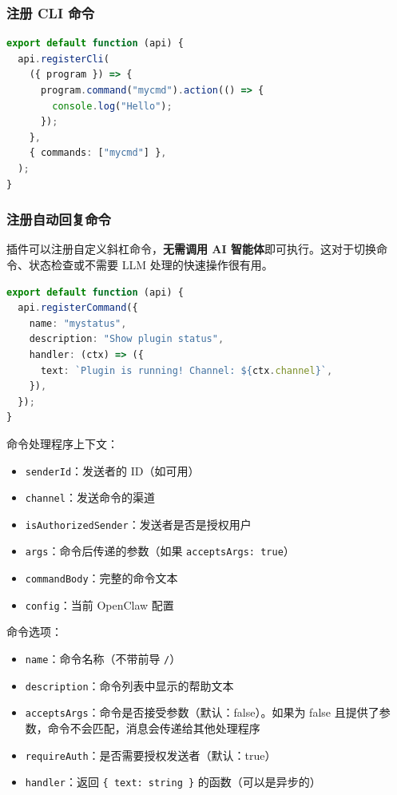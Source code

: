 \subsubsection{注册 CLI 命令}


\begin{lstlisting}[language=typescript]
export default function (api) {
  api.registerCli(
    ({ program }) => {
      program.command("mycmd").action(() => {
        console.log("Hello");
      });
    },
    { commands: ["mycmd"] },
  );
}
\end{lstlisting}


\subsubsection{注册自动回复命令}


插件可以注册自定义斜杠命令，\textbf{无需调用 AI 智能体}即可执行。这对于切换命令、状态检查或不需要 LLM 处理的快速操作很有用。

\begin{lstlisting}[language=typescript]
export default function (api) {
  api.registerCommand({
    name: "mystatus",
    description: "Show plugin status",
    handler: (ctx) => ({
      text: `Plugin is running! Channel: ${ctx.channel}`,
    }),
  });
}
\end{lstlisting}


命令处理程序上下文：

\begin{itemize}
  \item \texttt{senderId}：发送者的 ID（如可用）
  \item \texttt{channel}：发送命令的渠道
  \item \texttt{isAuthorizedSender}：发送者是否是授权用户
  \item \texttt{args}：命令后传递的参数（如果 \texttt{acceptsArgs: true}）
  \item \texttt{commandBody}：完整的命令文本
  \item \texttt{config}：当前 OpenClaw 配置
\end{itemize}


命令选项：

\begin{itemize}
  \item \texttt{name}：命令名称（不带前导 \texttt{/}）
  \item \texttt{description}：命令列表中显示的帮助文本
  \item \texttt{acceptsArgs}：命令是否接受参数（默认：false）。如果为 false 且提供了参数，命令不会匹配，消息会传递给其他处理程序
  \item \texttt{requireAuth}：是否需要授权发送者（默认：true）
  \item \texttt{handler}：返回 \texttt{\{ text: string \}} 的函数（可以是异步的）
\end{itemize}


